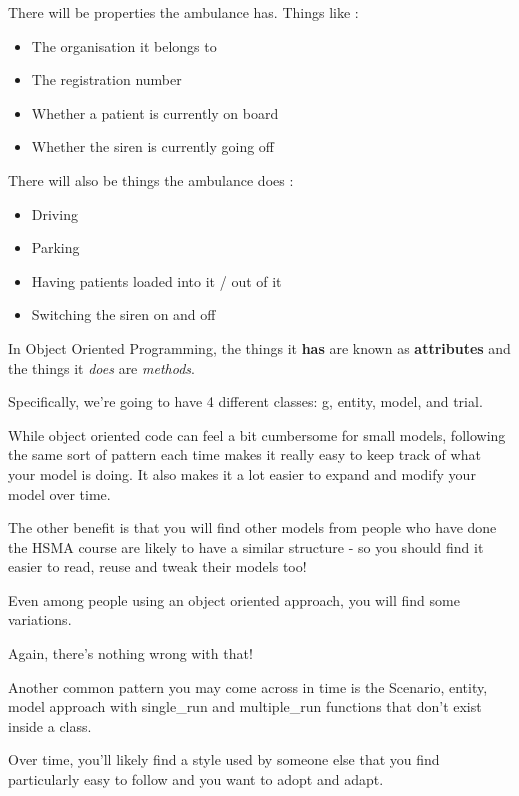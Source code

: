 \documentclass[
  letterpaper,
  DIV=11,
  numbers=noendperiod]{scrreprt}
\providecommand{\tightlist}{%
  \setlength{\itemsep}{0pt}\setlength{\parskip}{0pt}}\usepackage{longtable,booktabs,array}
\begin{document}
\begin{tcolorbox}
There will be properties the ambulance has. Things like :

\begin{itemize}
\tightlist
\item
  The organisation it belongs to
\item
  The registration number
\item
  Whether a patient is currently on board
\item
  Whether the siren is currently going off
\end{itemize}

There will also be things the ambulance does :

\begin{itemize}
\tightlist
\item
  Driving
\item
  Parking
\item
  Having patients loaded into it / out of it
\item
  Switching the siren on and off
\end{itemize}

In Object Oriented Programming, the things it \textbf{has} are known as
\textbf{attributes} and the things it \emph{does} are \emph{methods}.

\end{tcolorbox}

Specifically, we're going to have 4 different classes: g, entity, model,
and trial.

While object oriented code can feel a bit cumbersome for small models,
following the same sort of pattern each time makes it really easy to
keep track of what your model is doing. It also makes it a lot easier to
expand and modify your model over time.

The other benefit is that you will find other models from people who
have done the HSMA course are likely to have a similar structure - so
you should find it easier to read, reuse and tweak their models too!

\begin{tcolorbox}[enhanced jigsaw, colframe=quarto-callout-note-color-frame, bottomtitle=1mm, breakable, rightrule=.15mm, coltitle=black, colbacktitle=quarto-callout-note-color!10!white, opacityback=0, leftrule=.75mm, arc=.35mm, toptitle=1mm, title=\textcolor{quarto-callout-note-color}{\faInfo}\hspace{0.5em}{Note}, titlerule=0mm, colback=white, toprule=.15mm, bottomrule=.15mm, left=2mm, opacitybacktitle=0.6]

Even among people using an object oriented approach, you will find some
variations.

Again, there's nothing wrong with that!

Another common pattern you may come across in time is the Scenario,
entity, model approach with single\_run and multiple\_run functions that
don't exist inside a class.

Over time, you'll likely find a style used by someone else that you find
particularly easy to follow and you want to adopt and adapt.

\end{tcolorbox}
\end{document}
